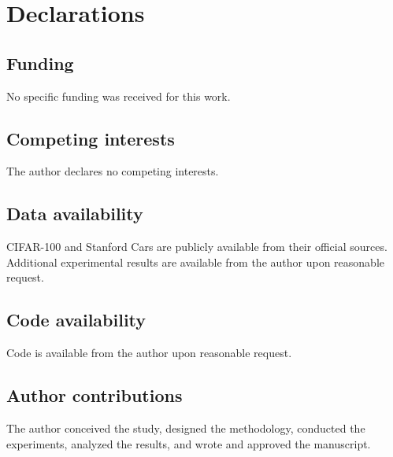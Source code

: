 \documentclass[pdflatex,iicol,sn-mathphys-num]{sn-jnl}
\theoremstyle{thmstyleone}%
\theoremstyle{thmstyletwo}%
\theoremstyle{thmstylethree}%
\begin{document}
\section*{Declarations}

\subsection*{Funding}
No specific funding was received for this work.

\subsection*{Competing interests}
The author declares no competing interests.

\subsection*{Data availability}
CIFAR-100 and Stanford Cars are publicly available from their official sources. Additional experimental results are available from the author upon reasonable request.

\subsection*{Code availability}
Code is available from the author upon reasonable request.

\subsection*{Author contributions}
The author conceived the study, designed the methodology, conducted the experiments, analyzed the results, and wrote and approved the manuscript.
\end{document}
